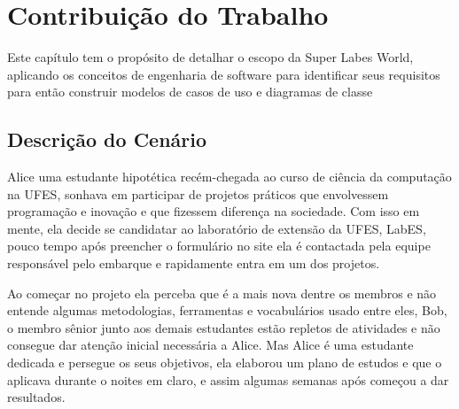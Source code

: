 \chapter{Contribuição do Trabalho}
\label{sec-contribuicao}



Este capítulo tem o propósito de detalhar o escopo da Super Labes World, aplicando os conceitos de engenharia de software para identificar seus requisitos para então construir modelos de casos de uso e diagramas de classe
\section{Descrição do Cenário}
\label{sec:descricao-do-cenario}
Alice uma estudante hipotética recém-chegada ao curso de ciência da computação na UFES, sonhava em participar de projetos práticos que envolvessem programação e inovação e que fizessem diferença na sociedade. Com isso em mente, ela decide se candidatar ao laboratório de extensão da UFES, LabES, pouco tempo após preencher o formulário no site ela é contactada pela equipe responsável pelo embarque e rapidamente entra em um dos projetos.

Ao começar no projeto ela perceba que é a mais nova dentre os membros e não entende algumas metodologias, ferramentas e vocabulários usado entre eles, Bob, o membro sênior junto aos demais estudantes estão repletos de atividades e não consegue dar atenção inicial necessária a Alice. Mas Alice é uma estudante dedicada e persegue os seus objetivos, ela elaborou um plano de estudos e que o aplicava durante o noites em claro, e assim algumas semanas após começou a dar resultados.

